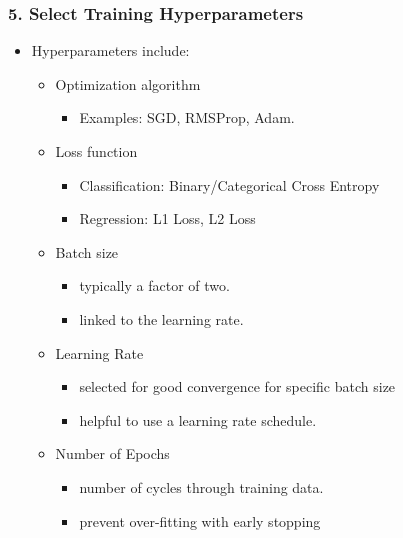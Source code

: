 \documentclass{beamer}
\begin{document}
\begin{frame}
    \frametitle{5. Select Training Hyperparameters}

    \begin{itemize}
        \item Hyperparameters include:
        \begin{itemize}
            \item Optimization algorithm
            \begin{itemize}
                \item Examples: SGD, RMSProp, Adam.
            \end{itemize}
            \item Loss function
            \begin{itemize}
                \item Classification: Binary/Categorical Cross Entropy
                \item Regression: L1 Loss, L2 Loss
            \end{itemize}
            \item Batch size
            \begin{itemize}
                \item typically a factor of two.
                \item linked to the learning rate.
            \end{itemize}
            \item Learning Rate
            \begin{itemize}
                \item selected for good convergence for specific batch size
                \item helpful to use a learning rate schedule.
            \end{itemize}
            \item Number of Epochs
            \begin{itemize}
                \item number of cycles through training data.
                \item prevent over-fitting with early stopping
            \end{itemize}

        \end{itemize}

    \end{itemize}

    
\end{frame}
\end{document}

